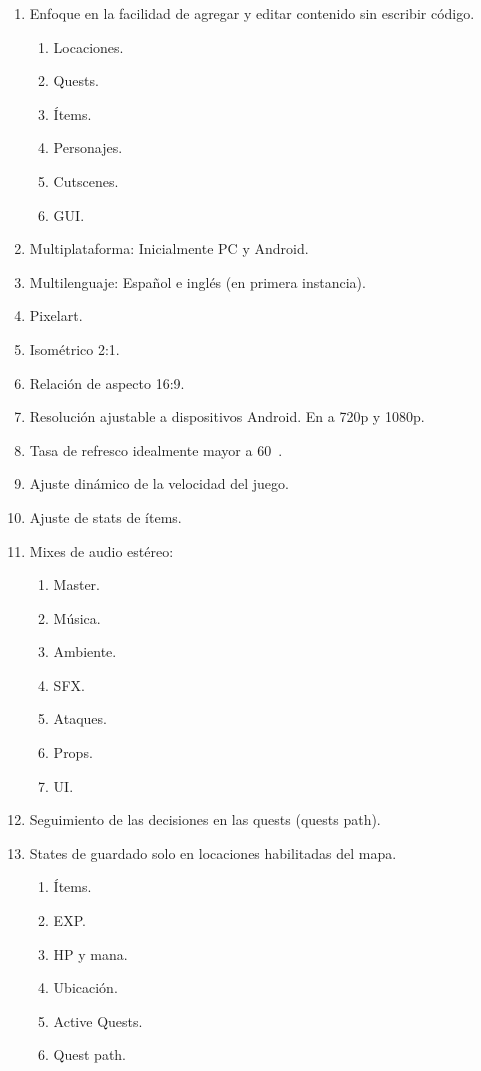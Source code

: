 \begin{enumerate}%
	\item Enfoque en la facilidad de agregar y editar contenido sin escribir código.
	\begin{enumerate}[noitemsep]
		\item Locaciones.
		\item Quests.
		\item Ítems.
		\item Personajes.
		\item Cutscenes.
		\item GUI.
	\end{enumerate}
	\item Multiplataforma: Inicialmente PC y Android.
	\item Multilenguaje: Español e inglés (en primera instancia).
	\item Pixelart.
	\item Isométrico 2:1.
	\item Relación de aspecto 16:9.
	\item Resolución ajustable a dispositivos Android. En  a 720p y 1080p.
	\item Tasa de refresco idealmente mayor a 60~.
	\item Ajuste dinámico de la velocidad del juego.
	\item Ajuste de stats de ítems.
	\item Mixes de audio estéreo:
	\begin{enumerate}[noitemsep]
		\item Master.
		\item Música.
		\item Ambiente.
		\item SFX.
		\item Ataques.
		\item Props.
		\item UI.
	\end{enumerate}
	\item Seguimiento de las decisiones en las quests (quests path).
	\item States de guardado solo en locaciones habilitadas del mapa.
	\begin{enumerate}[noitemsep]
		\item Ítems.
		\item EXP.
		\item HP y mana.
		\item Ubicación.
		\item Active Quests.
		\item Quest path.

\end{enumerate}
\end{enumerate}

